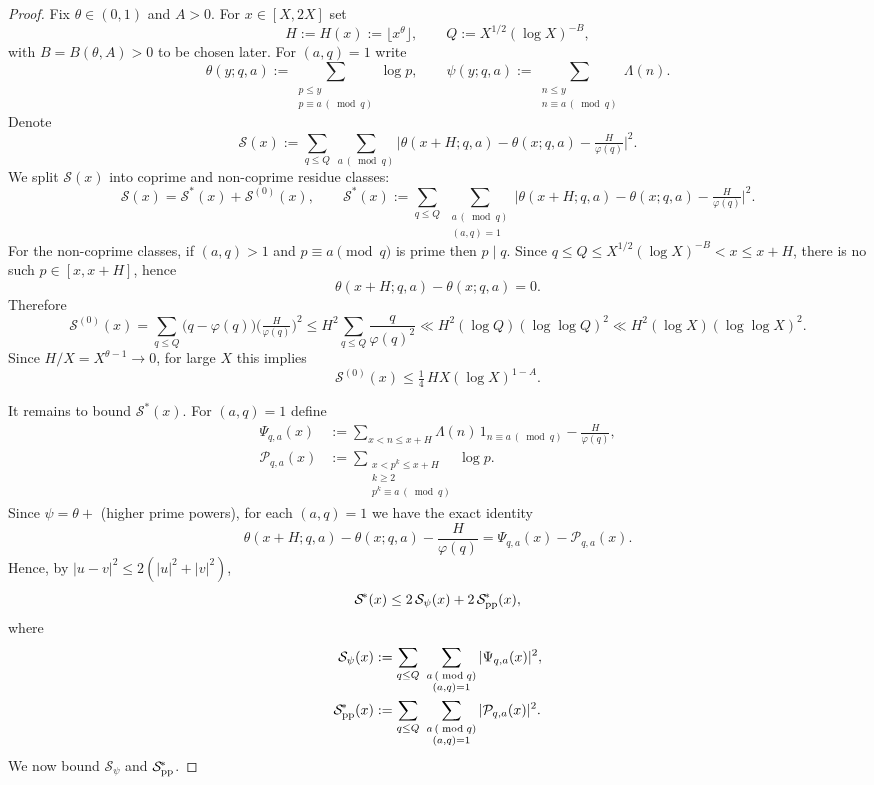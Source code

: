 \documentclass[11pt]{amsart}
\theoremstyle{definition}
\theoremstyle{remark}
\numberwithin{equation}{section}
\begin{document}
\begin{proof}
Fix $\theta\in(0,1)$ and $A>0$. For $x\in[X,2X]$ set
\[
H:=H(x):=\lfloor x^{\theta}\rfloor,\qquad Q:=X^{1/2}(\log X)^{-B},
\]
with $B=B(\theta,A)>0$ to be chosen later. For $(a,q)=1$ write
\[
\theta(y;q,a):=\sum_{\substack{p\le y\\ p\equiv a\, (\bmod q)}}\!\log p,\qquad \psi(y;q,a):=\sum_{\substack{n\le y\\ n\equiv a\, (\bmod q)}}\!\Lambda(n).
\]
Denote
\[
\mathcal S(x):=\sum_{q\le Q}\ \sum_{a\, (\bmod q)}\Big|\theta(x+H;q,a)-\theta(x;q,a)-\tfrac{H}{\varphi(q)}\Big|^2.
\]
We split $\mathcal S(x)$ into coprime and non-coprime residue classes:
\[
\mathcal S(x)=\mathcal S^{\!*}(x)+\mathcal S^{(0)}(x),\qquad \mathcal S^{\!*}(x):=\sum_{q\le Q}\ \sum_{\substack{a\, (\bmod q)\\ (a,q)=1}}\Big|\theta(x+H;q,a)-\theta(x;q,a)-\tfrac{H}{\varphi(q)}\Big|^2.
\]
For the non-coprime classes, if $(a,q)>1$ and $p\equiv a\pmod q$ is prime then $p\mid q$. Since $q\le Q\le X^{1/2}(\log X)^{-B}<x\le x+H$, there is no such $p\in[x,x+H]$, hence
\[
\theta(x+H;q,a)-\theta(x;q,a)=0.
\]
Therefore
\[
\mathcal S^{(0)}(x)=\sum_{q\le Q}\Big(q-\varphi(q)\Big)\Big(\tfrac{H}{\varphi(q)}\Big)^2\le H^2\sum_{q\le Q}\frac{q}{\varphi(q)^2}\ll H^2(\log Q)(\log\log Q)^2\ll H^2(\log X)(\log\log X)^2.
\]
Since $H/X=X^{\theta-1}\to0$, for large $X$ this implies
\[
\mathcal S^{(0)}(x)\le \tfrac14\,H X(\log X)^{1-A}.
\]

It remains to bound $\mathcal S^{\!*}(x)$. For $(a,q)=1$ define
\begin{align*}
\Psi_{q,a}(x)&:=\sum_{x<n\le x+H}\!\Lambda(n)\,1_{n\equiv a\, (\bmod q)}-\frac{H}{\varphi(q)},\\
\mathcal P_{q,a}(x)&:=\sum_{\substack{x<p^k\le x+H\\ k\ge2\\ p^k\equiv a\, (\bmod q)}}\!\log p.
\end{align*}
Since $\psi=\theta+$ (higher prime powers), for each $(a,q)=1$ we have the exact identity
\[
\theta(x+H;q,a)-\theta(x;q,a)-\frac{H}{\varphi(q)}=\Psi_{q,a}(x)-\mathcal P_{q,a}(x).
\]
Hence, by $|u-v|^2\le2(|u|^2+|v|^2)$,
\[
\mathcal S^{\!*}(x)\le 2\,\mathcal S_{\psi}(x)+2\,\mathcal S_{\rm pp}^{\!*}(x),
\]
where
\begin{align*}
\mathcal S_{\psi}(x)&:=\sum_{q\le Q}\ \sum_{\substack{a\, (\bmod q)\\ (a,q)=1}}|\Psi_{q,a}(x)|^2,\\
\mathcal S_{\rm pp}^{\!*}(x)&:=\sum_{q\le Q}\ \sum_{\substack{a\, (\bmod q)\\ (a,q)=1}}|\mathcal P_{q,a}(x)|^2.
\end{align*}
We now bound $\mathcal S_{\psi}$ and $\mathcal S_{\rm pp}^{\!*}$.


\end{proof}
\end{document}
